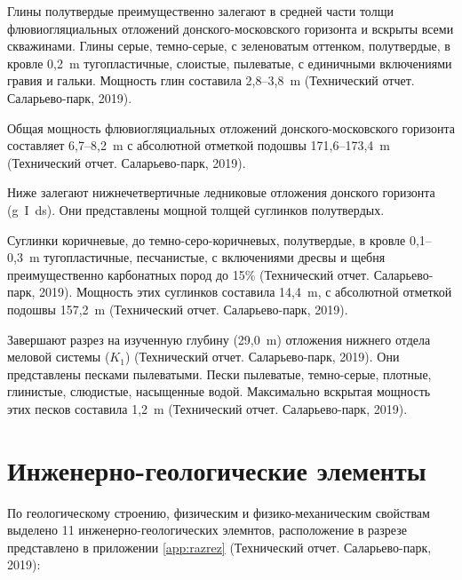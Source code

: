 Глины полутвердые преимущественно залегают в средней части толщи флювиогляциальных 
отложений донского-московского горизонта и вскрыты всеми скважинами.
Глины серые, темно-серые, с зеленоватым оттенком, полутвердые, 
в кровле 0,2~\si{\meter} тугопластичные, слоистые, пылеватые, 
с единичными включениями гравия и гальки. 
Мощность глин составила 2,8--3,8~\si{\meter} (Технический отчет. Саларьево-парк, 2019).

Общая мощность флювиогляциальных отложений донского-московского горизонта 
составляет 6,7--8,2~\si{\meter} с абсолютной отметкой подошвы 
171,6--173,4~\si{\meter} (Технический отчет. Саларьево-парк, 2019).

Ниже залегают нижнечетвертичные ледниковые отложения донского горизонта (g~I~ds). 
Они представлены мощной толщей суглинков полутвердых.

Суглинки коричневые, до темно-серо-коричневых, полутвердые, 
в кровле 0,1--0,3~\si{\meter} тугопластичные, песчанистые, 
с включениями дресвы и щебня преимущественно карбонатных 
пород до 15\% (Технический отчет. Саларьево-парк, 2019). 
Мощность этих суглинков составила 14,4~\si{\meter}, 
с абсолютной отметкой подошвы 157,2~\si{\meter} (Технический отчет. Саларьево-парк, 2019).

Завершают разрез на изученную глубину (29,0~\si{\meter}) отложения 
нижнего отдела меловой системы ($K_1$) (Технический отчет. Саларьево-парк, 2019). 
Они представлены песками пылеватыми. Пески пылеватые, темно-серые, 
плотные, глинистые, слюдистые, насыщенные водой. 
Максимально вскрытая мощность этих песков 
составила 1,2~\si{\meter} (Технический отчет. Саларьево-парк, 2019).

\section{Инженерно-геологические элементы}\label{sec:ch2/sec2}

По геологическому строению, физическим и физико-механическим 
свойствам выделено 11 инженерно-геологических элемнтов, расположение
в разрезе представлено в приложении \ref{app:razrez} (Технический отчет. Саларьево-парк, 2019):

